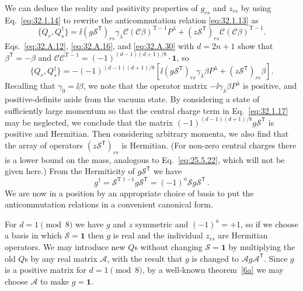 We can deduce the reality and positivity properties of \(g_{rs}\) and
\(z_{rs}\) by using Eq.~\eqref{eq:32.1.14} to rewrite the anticommutation
relation \eqref{eq:32.1.13} as
\[
  \{Q_r,Q_s^\dagger\}
  =\ii(g\mathcal S^{\mathsf T})_{rs}
    \gamma_\lambda\mathcal C(\mathcal C\beta)^{\mathrm T-1}P^\lambda
  +(z\mathcal S^{\mathsf T})_{rs}
    \mathcal C(\mathcal C\beta)^{\mathrm T-1}.
\]
Eqs.~\eqref{eq:32.A.12}, \eqref{eq:32.A.16}, and
\eqref{eq:32.A.30} with \(d=2n+1\) show that
\(\beta^{\mathsf T}=-\beta\) and
\(\mathcal C\mathcal C^{\mathrm T-1}
=(-1)^{(d-1)(d+1)/8}\mathbin{\cdot}\mathbf{1}\), so
\begin{equation}
  \{Q_r,Q_s^\dagger\}
  =-(-1)^{(d-1)(d+1)/8}
  \left[
    \ii(g\mathcal S^{\mathsf T})_{rs}\gamma_\lambda\beta P^\lambda
    +(z\mathcal S^{\mathsf T})_{rs}\beta
  \right].
  \tag{32.1.17}\label{eq:32.1.17}
\end{equation}
Recalling that \(\gamma_0=\ii\beta\), we note that the operator matrix
\(-\ii\gamma_\lambda\beta P^\lambda\) is positive, and positive-definite
aside from the vacuum state. By considering a state of sufficiently large
momentum so that the central charge term in Eq.~\eqref{eq:32.1.17} may be
neglected, we conclude that the matrix
\((-1)^{(d-1)(d+1)/8}g\mathcal S^{\mathsf T}\) is positive and Hermitian.
Then considering arbitrary momenta, we also find that the array of operators
\((z\mathcal S^{\mathsf T})_{rs}\) is Hermitian. (For non-zero central
charges there is a lower bound on the mass, analogous to
Eq.~\eqref{eq:25.5.22}, which will not be given here.) From the Hermiticity
of \(g\mathcal S^{\mathsf T}\) we have
\begin{equation}
  g^\dagger
  =\mathcal S^{\mathrm T\dagger-1}g\mathcal S^{\mathsf T}
  =(-1)^a\mathcal Sg\mathcal S^{\mathsf T}\,.
  \tag{32.1.18}\label{eq:32.1.18}
\end{equation}
We are now in a position by an appropriate choice of basis to put the
anticommutation relations in a convenient canonical form.

For \(d=1\pmod 8\) we have \(g\) and \(z\) symmetric and
\((-1)^a=+1\), so if we choose a basis in which
\(\mathcal S=\mathbf{1}\) then \(g\) is real and the individual \(z_{rs}\)
are Hermitian operators. We may introduce new \(Q\)s without changing
\(\mathcal S=\mathbf{1}\) by multiplying the old \(Q\)s by any real matrix
\(\mathcal A\), with the result that \(g\) is changed to
\(\mathcal A g\mathcal A^{\mathsf T}\). Since \(g\) is a positive matrix
for \(d=1\pmod 8\), by a well-known theorem~\hyperref[ch32-ref-6a]{[6a]}
we may choose \(\mathcal A\) to make \(g=\mathbf{1}\).

